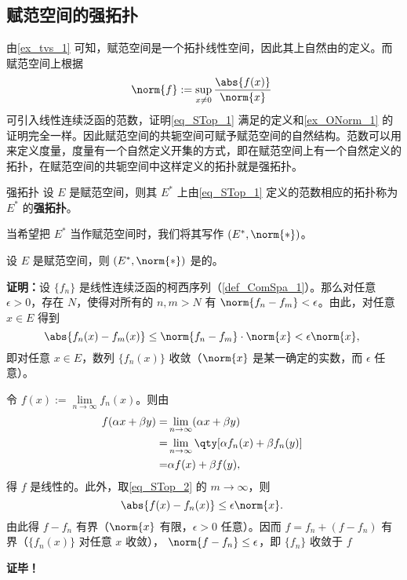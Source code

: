 
\subsection{赋范空间的强拓扑}

由\autoref{ex_tvs_1} 可知，赋范空间是一个拓扑线性空间，因此其上自然由的定义。而赋范空间上根据
\begin{equation}\label{eq_STop_1}
\norm{f}:=\sup_{x\neq0}\frac{\abs{f(x)}}{\norm{x}}~
\end{equation}
可引入线性连续泛函的范数，证明\autoref{eq_STop_1} 满足的定义和\autoref{ex_ONorm_1} 的证明完全一样。因此赋范空间的共轭空间可赋予赋范空间的自然结构。范数可以用来定义度量，度量有一个自然定义开集的方式，即在赋范空间上有一个自然定义的拓扑，在赋范空间的共轭空间中这样定义的拓扑就是强拓扑。
\begin{definition}{强拓扑}
设 $E$ 是赋范空间，则其 $E^*$ 上由\autoref{eq_STop_1} 定义的范数相应的拓扑称为 $E^*$ 的\textbf{强拓扑}。
\end{definition}

当希望把 $E^*$ 当作赋范空间时，我们将其写作 $(E^*,\norm{*})$。

\begin{theorem}{}
设 $E$ 是赋范空间，则 $(E^*,\norm{*})$ 是的。
\end{theorem}

\textbf{证明：}设 $\{f_n\}$ 是线性连续泛函的柯西序列（\autoref{def_ComSpa_1}）。那么对任意 $\epsilon>0$，存在 $N$，使得对所有的 $n,m>N$ 有 $\norm{f_n-f_m}<\epsilon$。由此，对任意 $x\in E$ 得到
\begin{equation}\label{eq_STop_2}
\abs{f_n(x)-f_m(x)}\leq\norm{f_n-f_m}\cdot\norm{x}<\epsilon\norm{x},~
\end{equation}
即对任意 $x\in E$，数列 $\{f_n(x)\}$ 收敛（$\norm{x}$ 是某一确定的实数，而 $\epsilon$ 任意）。

令 $f(x):=\lim\limits_{n\rightarrow\infty}f_n(x)$。则由
\begin{equation}
\begin{aligned}
f(\alpha x+\beta y)=&\lim_{n\rightarrow\infty}(\alpha x+\beta y)\\
=&\lim_{n\rightarrow\infty}\qty[\alpha f_n(x)+\beta f_n(y)]\\
=&\alpha f(x)+\beta f(y),
\end{aligned}~
\end{equation}
得 $f$ 是线性的。此外，取\autoref{eq_STop_2} 的 $m\rightarrow\infty$，则 
\begin{equation}
\abs{f(x)-f_n(x)}\leq \epsilon\norm{x}.~
\end{equation}
由此得 $f-f_n$ 有界（$\norm{x}$ 有限，$\epsilon>0$ 任意）。因而 $f=f_n+(f-f_n)$ 有界（$\{f_n(x)\}$ 对任意 $x$ 收敛）， $\norm{f-f_n}\leq\epsilon$，即 $\{f_n\}$ 收敛于 $f$



\textbf{证毕！}


